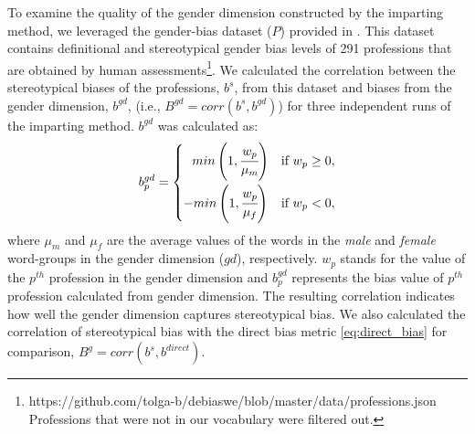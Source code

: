 \documentclass[11pt,a4paper]{article}
\begin{document}
To examine the quality of the gender dimension constructed by the imparting method, we leveraged the gender-bias dataset ($P$) provided in \citep{bolukbasi16debiasing}. This dataset contains definitional and stereotypical gender bias levels of 291 professions that are obtained by human assessments\footnote{https://github.com/tolga-b/debiaswe/blob/master/data/professions.json\\Professions that were not in our vocabulary were filtered out.}. We calculated the correlation between the stereotypical biases of the professions, $b^s$, from this dataset and biases from the gender dimension, $b^{gd}$, (i.e., $ B^{gd} = corr(b^s, b^{gd})$) for three independent runs of the imparting method. $b^{gd}$ was calculated as: 
\begin{align}
\begin{split}
     b^{gd}_p = 
     \begin{cases}
		~~min \left( 1, \cfrac{w_{p}}{\mu_m} \right) & \text{if } w_{p} \geq 0, \vspace{0.1cm} \\ 
		-min \left( 1, \cfrac{w_{p}}{\mu_f} \right) & \text{if } w_{p} < 0,
	\end{cases}
\end{split}
\label{eq:measure_bias}
\end{align}
where $\mu_m$ and $\mu_f$ are the average values of the words in the \textit{male} and \textit{female} word-groups in the gender dimension ($gd$), respectively. $w_p$ stands for the value of the $p^{th}$ profession in the gender dimension and $b^{gd}_p$ represents the bias value of $p^{th}$ profession calculated from gender dimension. The resulting correlation indicates how well the gender dimension captures stereotypical bias. We also calculated the correlation of stereotypical bias with the direct bias metric \eqref{eq:direct_bias} for comparison, $B^g = corr(b^s, b^{direct})$.

\end{document}
